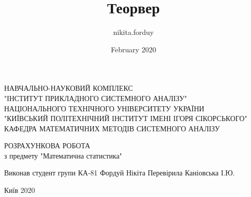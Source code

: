 \documentclass{article}
\title{Теорвер}
\author{nikita.forduy }
\date{February 2020}
\begin{document}
\pagestyle{empty}
\newtheorem{theorem}{Теорема}

\begin{titlepage}
    \thispagestyle{empty}
    \setlength{\parindent}{0ex} %
    
    \begin{center}
      НАВЧАЛЬНО-НАУКОВИЙ КОМПЛЕКС \\
      "ІНСТИТУТ ПРИКЛАДНОГО СИСТЕМНОГО АНАЛІЗУ" \\
      НАЦІОНАЛЬНОГО ТЕХНІЧНОГО УНІВЕРСИТЕТУ УКРАЇНИ \\
      "КИЇВСЬКИЙ ПОЛІТЕХНІЧНИЙ ІНСТИТУТ ІМЕНІ ІГОРЯ СІКОРСЬКОГО" \\
      \smallskip
      КАФЕДРА МАТЕМАТИЧНИХ МЕТОДІВ СИСТЕМНОГО АНАЛІЗУ \\
    \end{center}
    \vspace{60mm}
    
    \begin{center}
      РОЗРАХУНКОВА РОБОТА \\
      з предмету "Математична статистика" \\
    \end{center}
    
    \vspace{30mm}
    

    \hfill
    \begin{minipage}{.4\linewidth}
      \begin{flushright}
        Виконав студент групи КА-81
        Фордуй Нікіта
        \smallskip
        Перевірила Каніовська І.Ю.
      \end{flushright}
    \end{minipage}
    
    \vspace{10mm}

    \vfill
    \begin{center}
      Київ 2020
    \end{center}
    
    \setlength{\parindent}{5ex} %
\end{titlepage}

\pagestyle{plain}

\large
\end{document}
